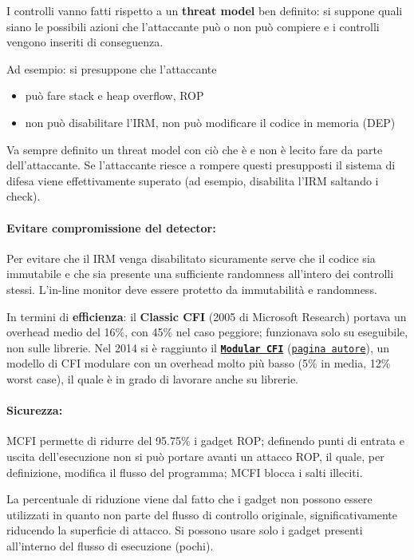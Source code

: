 I controlli vanno fatti rispetto a un \textbf{threat model} ben definito: si suppone quali siano le possibili azioni che l'attaccante può o non può compiere e i controlli vengono inseriti di conseguenza. 

Ad esempio: si presuppone che l'attaccante 
\begin{itemize}
	\item può fare stack e heap overflow, ROP
    
	\item non può disabilitare l'IRM, non può modificare il codice in memoria (DEP)
\end{itemize}

Va sempre definito un threat model con ciò che è e non è lecito fare da parte dell'attaccante. Se l'attaccante riesce a rompere questi presupposti il sistema di difesa viene effettivamente superato (ad esempio, disabilita l'IRM saltando i check).

\paragraph{Evitare compromissione del detector:} Per evitare che il IRM venga disabilitato sicuramente serve che il codice sia immutabile e che sia presente una sufficiente randomness all'intero dei controlli stessi. L'in-line monitor deve essere protetto da immutabilità e randomness.

In termini di \textbf{efficienza}: il \textbf{Classic CFI} (2005 di Microsoft Research) portava un overhead medio del 16\%, con 45\% nel caso peggiore; funzionava solo su eseguibile, non sulle librerie. Nel 2014 si è raggiunto il \href{https://www.cse.psu.edu/~gxt29/papers/mcfi.pdf}{\textbf{\texttt{Modular CFI}}} (\href{https://www.cse.psu.edu/~gxt29/}{\texttt{pagina autore}}), un modello di CFI modulare con un overhead molto più basso (5\% in media, 12\% worst case), il quale è in grado di lavorare anche su librerie.

\paragraph{Sicurezza:} MCFI permette di ridurre del 95.75\% i gadget ROP; definendo punti di entrata e uscita dell'esecuzione non si può portare avanti un attacco ROP, il quale, per definizione, modifica il flusso del programma; MCFI blocca i salti illeciti. 

La percentuale di riduzione viene dal fatto che i gadget non possono essere utilizzati in quanto non parte del flusso di controllo originale, significativamente riducendo la superficie di attacco. Si possono usare solo i gadget presenti all'interno del flusso di esecuzione (pochi).

